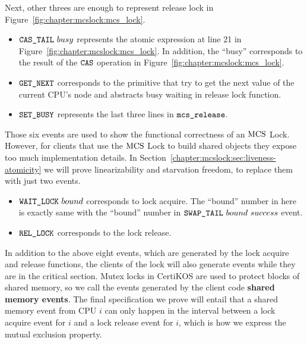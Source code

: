 Next, other threes are enough to represent release lock in Figure~\ref{fig:chapter:mcslock:mcs_lock}.

\begin{itemize}

\item \textbf{${\mathrm{\texttt{CAS\_TAIL}}}~{busy}$} represents the atomic expression at line 21  in Figure~\ref{fig:chapter:mcslock:mcs_lock}. 
In addition, the ``busy'' corresponds to the result of the ${\mathrm{\texttt{CAS}}}$ operation in Figure~\ref{fig:chapter:mcslock:mcs_lock}.

\item  \textbf{${\mathrm{\texttt{GET\_NEXT}}}$} corresponds to the primitive that try to get the next value of the current CPU's node and abstracts busy waiting in release lock function.

\item  \textbf{${\mathrm{\texttt{SET\_BUSY}}}$} represents the last three lines in ${\mathrm{\texttt{mcs\_release}}}$.
\end{itemize}

Those six events are used to show the functional correctness of
an $\mathrm{MCS}$ Lock. However, for clients that use the $\mathrm{MCS}$ Lock to build shared
objects they expose too much implementation details.
In Section~\ref{chapter:mcslock:sec:liveness-atomicity} we will prove linearizability and
starvation freedom,  to replace them
with just two events.


\begin{itemize} 
\item \textbf{${\mathrm{\texttt{WAIT\_LOCK}}}~{bound}$} corresponds to lock acquire. The ``bound'' number in here is exactly same with the ``bound'' number in ${\mathrm{\texttt{SWAP\_TAIL}}}~{bound}~{success}$ event.

\item \textbf{${\mathrm{\texttt{REL\_LOCK}}}$} corresponds to the lock release.
\end{itemize}

In addition to the above eight events, which are generated by the lock
acquire and release functions, the clients of the lock will also
generate events while they are in the critical section. Mutex locks in
CertiKOS are used to protect blocks of shared memory, so we call the
events generated by the client code \textbf{shared memory events}. The
final specification we prove will entail that a shared memory event
from CPU $i$ can only happen in the interval between a lock acquire
event for $i$ and a lock release event for $i$, which is how we
express the mutual exclusion property.
